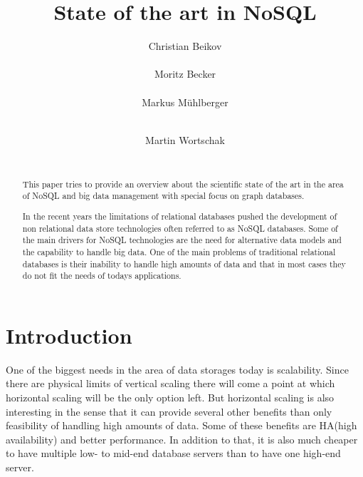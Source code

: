 \documentclass{sig-alternate}
\begin{document}
\title{State of the art in NoSQL}
\author{
\alignauthor Christian Beikov\\
       \\
\alignauthor Moritz Becker\\
       \\
\alignauthor Markus M\"uhlberger\\
       \\
\and  %
\alignauthor Martin Wortschak\\
       \\
}

\maketitle
\begin{abstract}

This paper tries to provide an overview about the scientific state of the art in the area of NoSQL and big data management with special focus on graph databases.

In the recent years the limitations of relational databases pushed the development of non relational data store technologies often referred to as NoSQL databases. Some of the main drivers for NoSQL technologies are the need for alternative data models and the capability to handle big data. One of the main problems of traditional relational databases is their inability to handle high amounts of data and that in most cases they do not fit the needs of todays applications.

\end{abstract}

\section{Introduction}

One of the biggest needs in the area of data storages today is scalability. Since there are physical limits of vertical scaling there will come a point at which horizontal scaling will be the only option left. But horizontal scaling is also interesting in the sense that it can provide several other benefits than only feasibility of handling high amounts of data. Some of these benefits are HA(high availability) and better performance. In addition to that, it is also much cheaper to have multiple low- to mid-end database servers than to have one high-end server.
\end{document}
